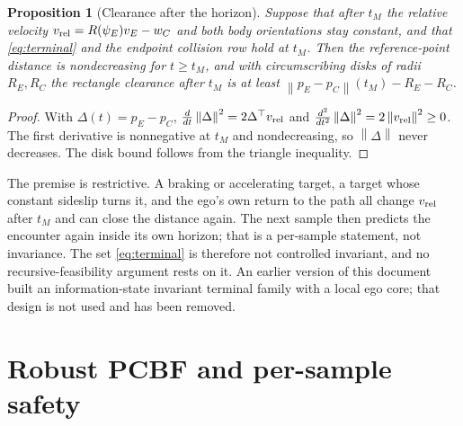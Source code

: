 \documentclass[10pt,letterpaper]{article}
\newtheorem{proposition}{Proposition}
\newcommand{\norm}[1]{\left\lVert#1\right\rVert}
\begin{document}
\begin{proposition}[Clearance after the horizon]\label{prop:separating}
Suppose that after $t_M$ the relative velocity $v_{\rm rel}=R(\psi_E)v_E-w_C$
and both body orientations stay constant, and that \eqref{eq:terminal} and the
endpoint collision row hold at $t_M$. Then the reference-point distance is
nondecreasing for $t\ge t_M$, and with circumscribing disks of radii $R_E,R_C$
the rectangle clearance after $t_M$ is at least
$\norm{p_E-p_C}(t_M)-R_E-R_C$.
\end{proposition}
\begin{proof}
With $\Delta(t)=p_E-p_C$, $\tfrac{d}{dt}\norm\Delta^2=2\Delta^\top v_{\rm rel}$
and $\tfrac{d^2}{dt^2}\norm\Delta^2=2\norm{v_{\rm rel}}^2\ge0$. The first
derivative is nonnegative at $t_M$ and nondecreasing, so $\norm\Delta$ never
decreases. The disk bound follows from the triangle inequality.
\end{proof}
The premise is restrictive. A braking or accelerating target, a target whose
constant sideslip turns it, and the ego's own return to the path all change
$v_{\rm rel}$ after $t_M$ and can close the distance again. The next sample
then predicts the encounter again inside its own horizon; that is a per-sample
statement, not invariance. The set \eqref{eq:terminal} is therefore not
controlled invariant, and no recursive-feasibility argument rests on it. An
earlier version of this document built an information-state invariant terminal
family with a local ego core; that design is not used and has been removed.

\section{Robust PCBF and per-sample safety}
\end{document}
